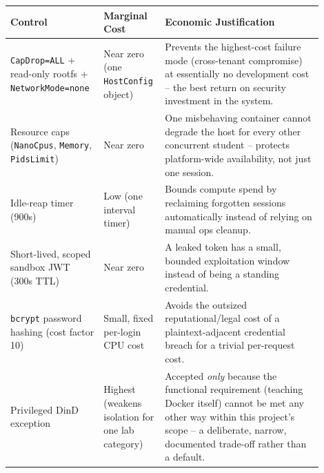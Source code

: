 \documentclass[11pt]{article}
\begin{document}
\begin{longtable}{@{}p{0.28\linewidth}p{0.14\linewidth}p{0.48\linewidth}@{}}
\toprule
\textbf{Control} & \textbf{Marginal Cost} & \textbf{Economic Justification} \\
\midrule
\endhead
\texttt{CapDrop=ALL} + read-only rootfs + \texttt{NetworkMode=none} &
Near zero (one \texttt{HostConfig} object) &
Prevents the highest-cost failure mode (cross-tenant compromise) at
essentially no development cost -- the best return on security
investment in the system. \\
Resource caps (\texttt{NanoCpus}, \texttt{Memory}, \texttt{PidsLimit}) &
Near zero &
One misbehaving container cannot degrade the host for every other
concurrent student -- protects platform-wide availability, not just
one session. \\
Idle-reap timer (900s) &
Low (one interval timer) &
Bounds compute spend by reclaiming forgotten sessions automatically
instead of relying on manual ops cleanup. \\
Short-lived, scoped sandbox JWT (300s TTL) &
Near zero &
A leaked token has a small, bounded exploitation window instead of
being a standing credential. \\
\texttt{bcrypt} password hashing (cost factor 10) &
Small, fixed per-login CPU cost &
Avoids the outsized reputational/legal cost of a plaintext-adjacent
credential breach for a trivial per-request cost. \\
Privileged DinD exception &
Highest (weakens isolation for one lab category) &
Accepted \emph{only} because the functional requirement (teaching
Docker itself) cannot be met any other way within this project's
scope -- a deliberate, narrow, documented trade-off rather than a
default. \\
\bottomrule
\end{longtable}
\end{document}
